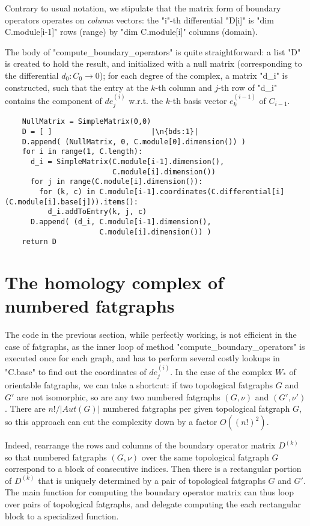 Contrary to usual notation, we stipulate that the matrix form of
boundary operators operates on \emph{column} vectors: the "i"-th
differential "D[i]" is "dim C.module[i-1]" rows (range) by 
"dim C.module[i]" columns (domain).

The body of "compute_boundary_operators" is quite straightforward: a
list "D" is created to hold the result, and initialized with a null
matrix (corresponding to the differential $d_0: C_0 \to 0$); for each
degree of the complex, a matrix "d_i" is constructed, such that the
entry at the $k$-th column and $j$-th row of "d_i" contains the
component of $de^{(i)}_j$ w.r.t. the $k$-th basis vector $e^{(i-1)}_k$
of $C_{i-1}$.
\begin{lstlisting}
    NullMatrix = SimpleMatrix(0,0)
    D = [ ]                       |\n{bds:1}|
    D.append( (NullMatrix, 0, C.module[0].dimension()) )
    for i in range(1, C.length):
      d_i = SimpleMatrix(C.module[i-1].dimension(),
                         C.module[i].dimension())
      for j in range(C.module[i].dimension()):
        for (k, c) in C.module[i-1].coordinates(C.differential[i](C.module[i].base[j])).items():
          d_i.addToEntry(k, j, c)
      D.append( (d_i, C.module[i-1].dimension(), 
                      C.module[i].dimension()) )
    return D

\end{lstlisting}


\section{The homology complex of numbered fatgraphs}
\label{sec:homology-numbered-fatgraphs}

The code in the previous section, while perfectly working, is not
efficient in the case of fatgraphs, as the inner loop of method
"compute_boundary_operators" is executed once for each graph, and has
to perform several costly lookups in "C.base" to find out the
coordinates of $de^{(i)}_j$.  In the case of the complex $W_*$
of orientable fatgraphs, we can take a shortcut: if two topological
fatgraphs $G$ and $G'$ are not isomorphic, so are any two numbered
fatgraphs $(G,\nu)$ and $(G',\nu')$.  There are $n! / |Aut(G)|$
numbered fatgraphs per given topological fatgraph $G$, so this
approach can cut the complexity down by a factor $O((n!)^2)$.

Indeed, rearrange the rows and columns of the boundary operator matrix
$D^{(k)}$ so that numbered fatgraphs $(G,\nu)$ over the same
topological fatgraph $G$ correspond to a block of consecutive
indices. Then there is a rectangular portion of $D^{(k)}$ that is
uniquely determined by a pair of topological fatgraphs $G$ and $G'$.
The main function for computing the boundary operator matrix can thus loop
over pairs of topological fatgraphs, and delegate computing the each
rectangular block to a specialized function.

